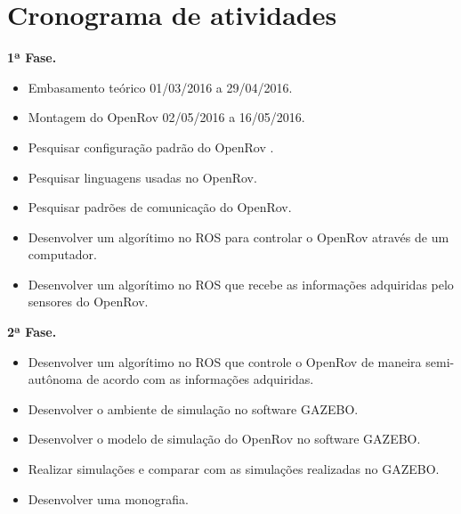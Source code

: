 \chapter{Cronograma de atividades}






\textbf{\large 1ª Fase.}
 
\begin{itemize}

	\item Embasamento teórico 01/03/2016 a 29/04/2016.
	\item Montagem do OpenRov 02/05/2016 a 16/05/2016.
	\item Pesquisar configuração padrão do OpenRov .
	\item Pesquisar linguagens usadas no OpenRov.
	\item Pesquisar padrões de comunicação do OpenRov.
	\item Desenvolver um algorítimo no ROS para controlar o OpenRov através de um computador.
	\item Desenvolver um algorítimo no ROS que recebe as informações adquiridas pelo sensores do OpenRov.

\end{itemize}

 \textbf{\large 2ª Fase.}
 
\begin{itemize}

	\item Desenvolver um algorítimo no ROS que controle o OpenRov de maneira semi-autônoma de acordo com as informações adquiridas.
    \item Desenvolver o ambiente de simulação no software GAZEBO.
	\item Desenvolver o modelo de simulação do OpenRov no software GAZEBO.
	\item Realizar simulações e comparar com as simulações realizadas no GAZEBO.
	\item Desenvolver uma monografia.

\end{itemize}
